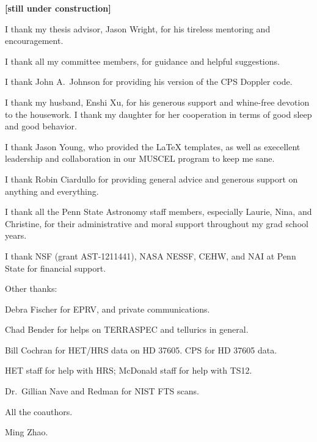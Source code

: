\textbf{[still under construction]}

I thank my thesis advisor, Jason Wright, for his tireless mentoring
and encouragement.

I thank all my committee members, for guidance and helpful suggestions.

I thank John A.\ Johnson for providing his version of the CPS Doppler code.

I thank my husband, Enshi Xu, for his generous support and whine-free
devotion to the housework. I thank my daughter for her cooperation in
terms of good sleep and good behavior.

I thank Jason Young, who provided the LaTeX templates, as well as
execellent leadership and collaboration in our MUSCEL program to keep me sane.

I thank Robin Ciardullo for providing general advice and generous
support on anything and everything. 

I thank all the Penn State Astronomy staff members, especially Laurie, Nina,
and Christine, for their administrative and moral support throughout
my grad school years.

I thank NSF (grant AST-1211441), NASA NESSF, CEHW, and NAI at Penn State for financial
support. 

Other thanks:

Debra Fischer for EPRV, and private communications.

Chad Bender for helps on TERRASPEC and tellurics in general.

Bill Cochran for HET/HRS data on HD 37605. CPS for HD 37605 data.

HET staff for help with HRS; McDonald staff for help with TS12.

Dr.\ Gillian Nave and Redman for NIST FTS scans.

All the coauthors.

Ming Zhao.

